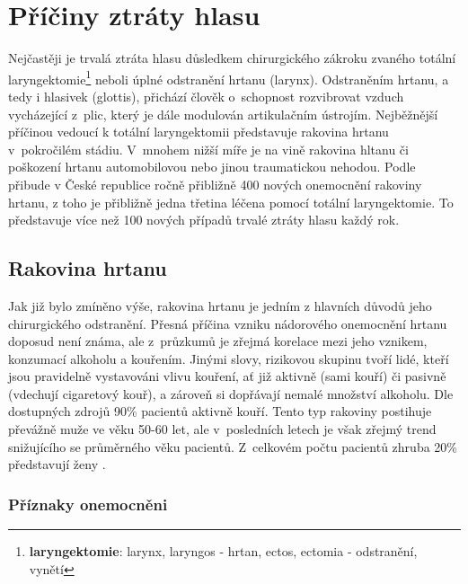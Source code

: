 \section{Příčiny ztráty hlasu}
\label{chap:cause:desease}

Nejčastěji je trvalá ztráta hlasu důsledkem chirurgického zákroku zvaného
totální laryngektomie\footnote{\textbf{laryngektomie}: larynx, laryngos -
hrtan, ectos, ectomia - odstranění, vynětí} neboli úplné odstranění hrtanu (larynx).
Odstraněním hrtanu, a tedy i hlasivek (glottis), přichází člověk o~schopnost
rozvibrovat vzduch vycházející z~plic, který je dále modulován artikulačním
ústrojím. Nejběžnější příčinou vedoucí k totální laryngektomii představuje
rakovina hrtanu v~pokročilém stádiu. V~mnohem nižší míře je na vině rakovina
hltanu či poškození hrtanu automobilovou nebo jinou traumatickou nehodou.
Podle \cite{Slavicek2000} přibude v České republice ročně přibližně 400 nových
onemocnění rakoviny hrtanu, z toho je přibližně jedna třetina léčena pomocí
totální laryngektomie. To představuje více než 100 nových případů trvalé
ztráty hlasu každý rok.

\subsection{Rakovina hrtanu} %
\label{chap:cause:desease:cancer}

Jak již bylo zmíněno výše, rakovina hrtanu je jedním z hlavních důvodů jeho chirurgického odstranění.
Přesná příčina vzniku nádorového onemocnění hrtanu doposud není známa, ale
z~průzkumů je zřejmá korelace mezi jeho vznikem, konzumací alkoholu a
kouřením. Jinými slovy, rizikovou skupinu tvoří lidé, kteří jsou
pravidelně vystavováni vlivu kouření, ať již aktivně (sami kouří) či pasivně
(vdechují cigaretový kouř), a zároveň si dopřávají nemalé množství alkoholu.
Dle dostupných zdrojů %
90\% pacientů aktivně kouří.
Tento typ rakoviny postihuje převážně muže ve věku 50-60 let,
ale v~posledních letech je však zřejmý trend snižujícího se průměrného věku
pacientů. Z~celkovém počtu pacientů zhruba 20\%
představují ženy \cite{Skvrnakova2010}.



\subsubsection{Příznaky onemocněni} %
\label{chap:cause:desease:cancer:symptom}

